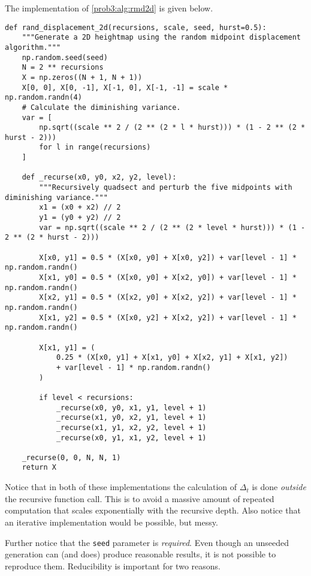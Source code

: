 The implementation of \autoref{prob3:alg:rmd2d} is given below.

\begin{verbatim}
def rand_displacement_2d(recursions, scale, seed, hurst=0.5):
    """Generate a 2D heightmap using the random midpoint displacement algorithm."""
    np.random.seed(seed)
    N = 2 ** recursions
    X = np.zeros((N + 1, N + 1))
    X[0, 0], X[0, -1], X[-1, 0], X[-1, -1] = scale * np.random.randn(4)
    # Calculate the diminishing variance.
    var = [
        np.sqrt((scale ** 2 / (2 ** (2 * l * hurst))) * (1 - 2 ** (2 * hurst - 2)))
        for l in range(recursions)
    ]

    def _recurse(x0, y0, x2, y2, level):
        """Recursively quadsect and perturb the five midpoints with diminishing variance."""
        x1 = (x0 + x2) // 2
        y1 = (y0 + y2) // 2
        var = np.sqrt((scale ** 2 / (2 ** (2 * level * hurst))) * (1 - 2 ** (2 * hurst - 2)))

        X[x0, y1] = 0.5 * (X[x0, y0] + X[x0, y2]) + var[level - 1] * np.random.randn()
        X[x1, y0] = 0.5 * (X[x0, y0] + X[x2, y0]) + var[level - 1] * np.random.randn()
        X[x2, y1] = 0.5 * (X[x2, y0] + X[x2, y2]) + var[level - 1] * np.random.randn()
        X[x1, y2] = 0.5 * (X[x0, y2] + X[x2, y2]) + var[level - 1] * np.random.randn()

        X[x1, y1] = (
            0.25 * (X[x0, y1] + X[x1, y0] + X[x2, y1] + X[x1, y2])
            + var[level - 1] * np.random.randn()
        )

        if level < recursions:
            _recurse(x0, y0, x1, y1, level + 1)
            _recurse(x1, y0, x2, y1, level + 1)
            _recurse(x1, y1, x2, y2, level + 1)
            _recurse(x0, y1, x1, y2, level + 1)

    _recurse(0, 0, N, N, 1)
    return X
\end{verbatim}

Notice that in both of these implementations the calculation of $\Delta_t$ is done \textit{outside} the recursive function call.
This is to avoid a massive amount of repeated computation that scales exponentially with the recursive depth.
Also notice that an iterative implementation would be possible, but messy.

Further notice that the \texttt{seed} parameter is \textit{required}.
Even though an unseeded generation can (and does) produce reasonable results, it is not possible to reproduce them.
Reducibility is important for two reasons.

